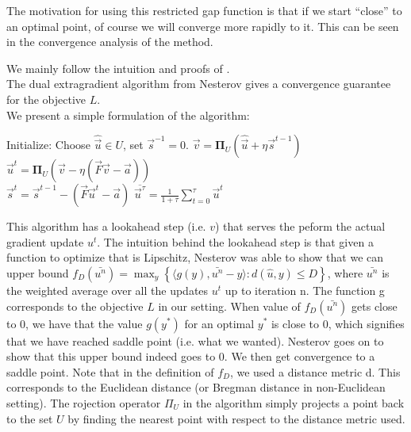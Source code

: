 The motivation for using this restricted gap function is that if we start
``close'' to an optimal point, of course we will converge more rapidly to it.
This can be seen in the convergence analysis of the method.






We mainly follow the intuition and proofs of \cite{taskarStructuredPredictionExtragradient}.\\
The dual extragradient algorithm from Nesterov gives a convergence guarantee for
the objective ${L}$.\\
We present a simple formulation of the algorithm:
\begin{algorithmic}
  \STATE Initialize: Choose $\hat{\vec u} \in {U}$, set $\vec s^{-1} = 0$.
  \STATE $\vec v = \mathbf{\Pi}_{{U}}(\hat{\vec u} + \eta \vec s^{t-1})$\\
  \STATE $\vec u^t = \mathbf{\Pi}_{{U}}(\vec v - \eta (\vec F \vec v - \vec a))$\\
  \STATE $\vec s^t =  \vec s^{t-1} - (\vec F \vec u^t - \vec a)$
  \ENDFOR
  \RETURN $\overline{\vec u^{\tau}} = \frac{1}{1 + \tau} \sum_{t=0}^{\tau} \vec u^t$
\end{algorithmic}

This algorithm has a lookahead step (i.e. $v$) that serves the peform the actual
gradient update $u^t$. The intuition behind the lookahead step is that given a
function to optimize that is Lipschitz, Nesterov was able to show that we can
upper bound $f_{D}(\bar{u^n}) = \max_y \left \{ \langle g(y),\bar{u^n} - y
\rangle : d(\hat{u},y) \leq D \right \}$, where $\bar{u^n}$ is the weighted
average over all the updates $u^t$ up to iteration n. The function g corresponds
to the objective ${L}$ in our setting. When value of $f_D(\bar{u^n})$
gets close to 0, we have that the value $g(y^*)$ for an optimal $y^*$ is close
to 0, which signifies that we have reached saddle point (i.e. what we wanted).
Nesterov goes on to show that this upper bound indeed goes to 0. We then get
convergence to a saddle point. Note that in the definition of $f_D$, we used a
distance metric d. This corresponds to the Euclidean distance (or Bregman
distance in non-Euclidean setting). The rojection operator $\Pi_{{U}}$
in the algorithm simply projects a point back to the set ${U}$ by
finding the nearest point with respect to the distance metric used.


